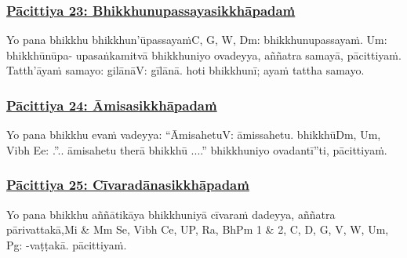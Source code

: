 \subsubsection*{\hyperref[exp23]{Pācittiya 23: Bhikkhunupassayasikkhāpadaṁ}}
\label{pac23}

Yo pana bhikkhu bhikkhun'ūpassayaṁ\makeatletter\hyperlink{endnote-appendix}\makeatother C, G, W,   Dm: bhikkhunupassayaṁ. Um: bhikkhūnūpa- upasaṅkamitvā bhikkhuniyo ovadeyya, aññatra samayā, pācittiyaṁ. Tatth'āyaṁ samayo: gilānā\makeatletter\hyperlink{endnote-appendix}\makeatother V: gīlānā. hoti bhikkhunī; ayaṁ tattha samayo.



\subsubsection*{\hyperref[exp24]{Pācittiya 24: Āmisasikkhāpadaṁ}}
\label{pac24}

Yo pana bhikkhu evaṁ vadeyya: ``Āmisahetu\makeatletter\hyperlink{endnote-appendix}\makeatother V: āmissahetu. bhikkhū\makeatletter\hyperlink{endnote-appendix}\makeatother Dm, Um, Vibh Ee: .”.. āmisahetu therā bhikkhū ....” bhikkhuniyo ovadantī''ti, pācittiyaṁ.



\subsubsection*{\hyperref[exp25]{Pācittiya 25: Cīvaradānasikkhāpadaṁ}}
\label{pac25}

Yo pana bhikkhu aññātikāya bhikkhuniyā cīvaraṁ dadeyya, aññatra pārivattakā,\makeatletter\hyperlink{endnote-appendix}\makeatother Mi & Mm Se, Vibh Ce, UP, Ra, BhPm 1 & 2, C, D, G, V, W, Um, Pg: -vaṭṭakā. pācittiyaṁ.



